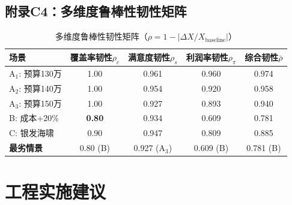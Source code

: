 \documentclass[12pt,a4paper]{ctexart}
\begin{document}
\subsection*{附录C4：多维度鲁棒性韧性矩阵}

\begin{table}[H]
\centering
\caption{多维度鲁棒性韧性矩阵（$\rho = 1 - |\Delta X / X_{\text{baseline}}|$）}
\label{tab:q4_resilience}
\begin{tabular}{lcccc}
\toprule
\textbf{场景} & \textbf{覆盖率韧性$\rho_c$} & \textbf{满意度韧性$\rho_s$} & \textbf{利润率韧性$\rho_\pi$} & \textbf{综合韧性$\bar{\rho}$} \\
\midrule
A$_1$: 预算130万 & 1.00 & 0.961 & 0.960 & 0.974 \\
A$_2$: 预算140万 & 1.00 & 0.954 & 0.920 & 0.958 \\
A$_3$: 预算150万 & 1.00 & 0.927 & 0.893 & 0.940 \\
B: 成本+20\% & \textbf{0.80} & 0.934 & 0.609 & 0.781 \\
C: 银发海啸 & 0.90 & 0.947 & 0.809 & 0.885 \\
\midrule
\textbf{最劣情景} & 0.80 (B) & 0.927 (A$_3$) & 0.609 (B) & 0.781 (B) \\
\bottomrule
\end{tabular}
\end{table}

\section{工程实施建议}


\end{document}
